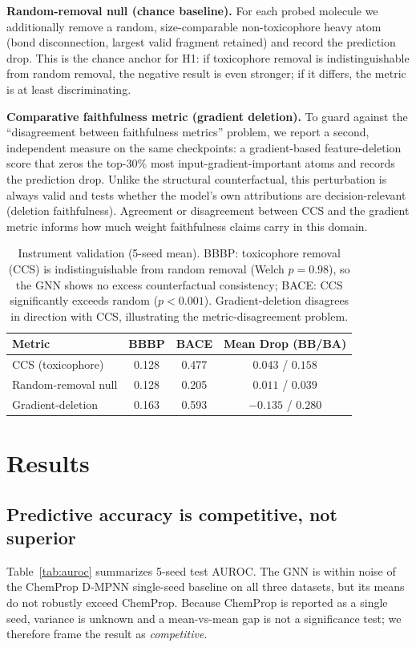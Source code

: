 \documentclass[conference]{IEEEtran}
\begin{document}
\textbf{Random-removal null (chance baseline).} For each probed molecule we additionally remove a random, size-comparable non-toxicophore heavy atom (bond disconnection, largest valid fragment retained) and record the prediction drop. This is the chance anchor for H1: if toxicophore removal is indistinguishable from random removal, the negative result is even stronger; if it differs, the metric is at least discriminating.

\textbf{Comparative faithfulness metric (gradient deletion).} To guard against the ``disagreement between faithfulness metrics'' problem, we report a second, independent measure on the same checkpoints: a gradient-based feature-deletion score that zeros the top-$30\%$ most input-gradient-important atoms and records the prediction drop. Unlike the structural counterfactual, this perturbation is always valid and tests whether the model's own attributions are decision-relevant (deletion faithfulness). Agreement or disagreement between CCS and the gradient metric informs how much weight faithfulness claims carry in this domain.

\begin{table}[t]
\centering
\caption{Instrument validation (5-seed mean). BBBP: toxicophore removal (CCS) is indistinguishable from random removal (Welch $p=0.98$), so the GNN shows no excess counterfactual consistency; BACE: CCS significantly exceeds random ($p<0.001$). Gradient-deletion disagrees in direction with CCS, illustrating the metric-disagreement problem.}
\label{tab:validate}
\begin{tabular}{l c c c}
\toprule
Metric & BBBP & BACE & Mean Drop (BB/BA) \\
\midrule
CCS (toxicophore) & 0.128 & 0.477 & $0.043$ / $0.158$ \\
Random-removal null & 0.128 & 0.205 & $0.011$ / $0.039$ \\
Gradient-deletion & 0.163 & 0.593 & $-0.135$ / $0.280$ \\
\bottomrule
\end{tabular}
\end{table}

\section{Results}
\subsection{Predictive accuracy is competitive, not superior}
Table~\ref{tab:auroc} summarizes 5-seed test AUROC. The GNN is within noise of the ChemProp D-MPNN single-seed baseline on all three datasets, but its means do not robustly exceed ChemProp. Because ChemProp is reported as a single seed, variance is unknown and a mean-vs-mean gap is not a significance test; we therefore frame the result as \emph{competitive}.
\end{document}
